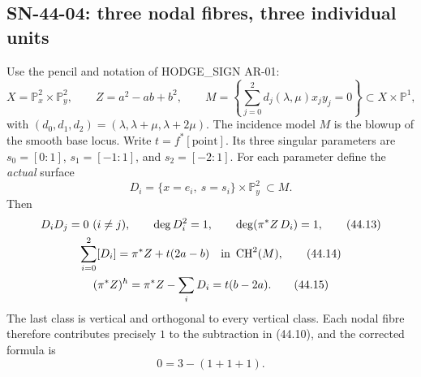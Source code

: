 \subsection{SN-44-04: three nodal fibres, three individual units}
\label{sn:44-04}

Use the pencil and notation of HODGE\_SIGN AR-01:
\[
 X=\mathbb P^2_x\times\mathbb P^2_y,\qquad
 Z=a^2-ab+b^2,\qquad
 M=\left\{\sum_{j=0}^2 d_j(\lambda,\mu)x_jy_j=0\right\}
       \subset X\times\mathbb P^1,
\]
with $(d_0,d_1,d_2)=(\lambda,\lambda+\mu,\lambda+2\mu)$.
The incidence model $M$ is the blowup of the smooth base locus.
Write $t=f^*[\mathrm{point}]$.  Its three singular parameters are
$s_0=[0:1]$, $s_1=[-1:1]$, and $s_2=[-2:1]$.  For each parameter
define the \emph{actual} surface
\[
 D_i=\{x=e_i,\ s=s_i\}\times\mathbb P^2_y\ \subset M.
 \tag{44.12}
\]
Then
\begin{gather}
 D_iD_j=0\ (i\ne j),\qquad \deg D_i^2=1,\qquad
 \deg(\pi^*Z\,D_i)=1,                                    \tag{44.13}\\
 \sum_{i=0}^2[D_i]=\pi^*Z+t(2a-b)
          \quad\hbox{in }\operatorname{CH}^2(M),           \tag{44.14}\\
 (\pi^*Z)^h=\pi^*Z-\sum_iD_i=t(b-2a).                    \tag{44.15}
\end{gather}
The last class is vertical and orthogonal to every vertical class.
Each nodal fibre therefore contributes precisely $1$ to the
subtraction in (44.10), and the corrected formula is
\[
 \boxed{\qquad 0=3-(1+1+1).\qquad}                       \tag{44.16}
\]

